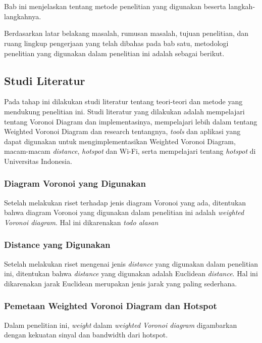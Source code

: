 \chapter{\babTiga}

Bab ini menjelaskan tentang metode penelitian yang digunakan beserta langkah-langkahnya.

Berdasarkan latar belakang masalah, rumusan masalah, tujuan penelitian, dan ruang lingkup pengerjaan yang telah dibahas pada bab satu, metodologi penelitian yang digunakan dalam penelitian ini adalah sebagai berikut.

\section{Studi Literatur}
Pada tahap ini dilakukan studi literatur tentang teori-teori dan metode yang mendukung penelitian ini. Studi literatur yang dilakukan adalah mempelajari tentang Voronoi Diagram dan implementasinya, mempelajari lebih dalam tentang Weighted Voronoi Diagram dan research tentangnya, \textit{tools} dan aplikasi yang dapat digunakan untuk mengimplementasikan Weighted Voronoi Diagram, macam-macam \textit{distance}, \textit{hotspot} dan Wi-Fi, serta mempelajari tentang \textit{hotspot} di Universitas Indonesia.

\subsection{Diagram Voronoi yang Digunakan}
Setelah melakukan riset terhadap jenis diagram Voronoi yang ada, ditentukan bahwa diagram Voronoi yang digunakan dalam penelitian ini adalah \textit{weighted Voronoi diagram}. Hal ini dikarenakan \textit{todo alasan} 

\subsection{Distance yang Digunakan}
Setelah melakukan riset mengenai jenis \textit{distance} yang digunakan dalam penelitian ini, ditentukan bahwa \textit{distance} yang digunakan adalah Euclidean \textit{distance}. Hal ini dikarenakan jarak Euclidean merupakan jenis jarak yang paling sederhana.

\subsection{Pemetaan Weighted Voronoi Diagram dan Hotspot}
Dalam penelitian ini, \textit{weight} dalam \textit{weighted Voronoi diagram} digambarkan dengan kekuatan sinyal dan bandwidth dari hotspot.

